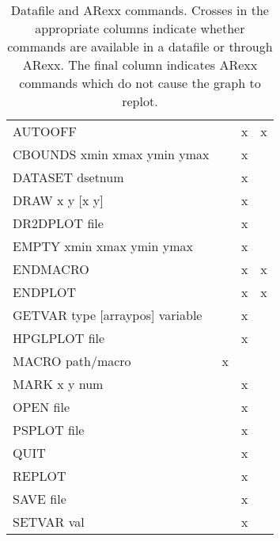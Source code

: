 \begin{table}[h]
\begin{center}
\begin{tabular}{lccc}
AUTOOFF                          &           &     x  &       x            \\
CBOUNDS xmin xmax ymin ymax      &           &     x  &                    \\
DATASET  dsetnum                 &           &     x  &                    \\
DRAW  x   y  [x   y]             &           &     x  &                    \\
DR2DPLOT  file                   &           &     x  &                    \\
EMPTY xmin xmax ymin ymax        &           &     x  &                    \\
ENDMACRO                         &           &     x  &       x            \\
ENDPLOT                          &           &     x  &       x            \\
GETVAR type [arraypos] variable  &           &     x  &                    \\
HPGLPLOT  file                   &           &     x  &                    \\
MACRO  path/macro                &     x     &        &                    \\
MARK  x   y   num                &           &     x  &                    \\
OPEN  file                       &           &     x  &                    \\
PSPLOT  file                     &           &     x  &                    \\
QUIT                             &           &     x  &                    \\
REPLOT                           &           &     x  &                    \\
SAVE  file                       &           &     x  &                    \\
SETVAR  val                      &           &     x  &                    \\ \hline
\end{tabular}           
\end{center}
\caption[Datafile and ARexx commands]{\label{tab:commands}Datafile and ARexx 
commands. Crosses 
in the appropriate columns indicate whether commands are available in a 
datafile or through ARexx. The final column indicates ARexx commands 
which do not cause the graph to replot.}
\end{table}
\clearpage

